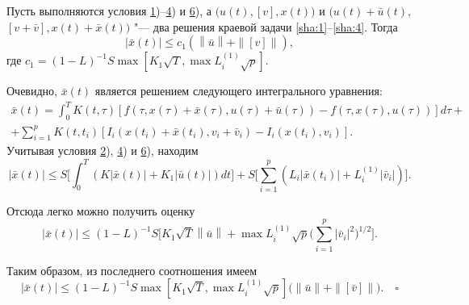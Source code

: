 \hypertarget{sha:lemma:1)}{}
\begin{lemma}[1]Пусть выполняются условия {\rm \hyperlink{sha:1)}{1})--\hyperlink{sha:4)}{4})} и {\rm \hyperlink{sha:6)}{6}),} а $\bigl(u(t), [v], x(t)\bigr)$ и 
$\bigl(u(t)+\bar{u}(t),$ $[v+\bar{v}], x(t)+\bar{x}(t)\bigr)$ "--- два решения краевой задачи \eqref{sha:1}--\eqref{sha:4}{\rm .} Тогда
\begin{equation} \label{sha:30} 
\left|\bar{x}(t)\right|\le c_{1}\left(\left\|\bar{u}\right\|+\|[v]\|\right),                                             
\end{equation} 
где $c_{1}=(1-L)^{-1} S\max\left[K_{1}\sqrt{T},\max L_{i}^{(1)}\sqrt{p}\right].$
\end{lemma}

\smallskip

\begin{mproof} Очевидно, $\bar{x}(t)$ является решением следующего интегрального уравнения:
\begin{multline} \label{sha:31} 
\bar{x}(t)=\int_{0}^{T}K(t,\tau)[f(\tau,x(\tau)+\bar{x}(\tau),u(\tau)+\bar{u}(\tau))-f(\tau,x(\tau),u(\tau))]d\tau+
\\ 
+\sum_{i=1}^{p}K(t,t_{i})\left[I_{i}(x(t_{i})+\bar{x}\left(t_{i}\right),v_{i}+\bar{v}_{i})-I_{i}(x(t_{i}),v_{i})\right] .
\end{multline} 
Учитывая условия \hyperlink{sha:2)}{2}), \hyperlink{sha:4)}{4}) и \hyperlink{sha:6)}{6}), находим
\begin{equation} \label{sha:32} 
\left|\bar{x}(t)\right|\le S\biggl[\int_{0}^{T}\left(K\left|\bar{x}(t)\right|+K_{1}\left|\bar{u}(t)\right|\right)dt\biggr]+
S\biggl[\sum_{i=1}^{p}\left(L_{i} \left|\bar{x}\left(t_{i}\right)\right|+L_{i}^{(1)}\left|\bar{v}_{i}\right|\right)\biggr]. 
\end{equation} 

\pagebreak
\noindent 
Отсюда легко можно получить оценку
\begin{equation} \label{sha:33} 
\left|\bar{x}(t)\right|\le(1-L)^{-1}S
\biggl[K_{1}\sqrt{T}\left\|\bar{u}\right\|+\max L_{i}^{(1)}\sqrt{p}\biggl(\sum_{i=1}^{p}\left|\bar{v}_{i}\right|^{2}\biggr)^{{1}/{2}}\biggr]. 
\end{equation} 



Таким образом, из последнего соотношения имеем
\begin{equation} \label{sha:34} 
\left|\bar{x}(t)\right|\le(1-L)^{-1}S\max\left[K_{1}\sqrt{T},\max L_{i}^{(1)}\sqrt{p}\right]
\bigl(\|\bar{u}\|+\|[\bar{v}]\|\bigr). \quad \square
\end{equation} 
\end{mproof}

